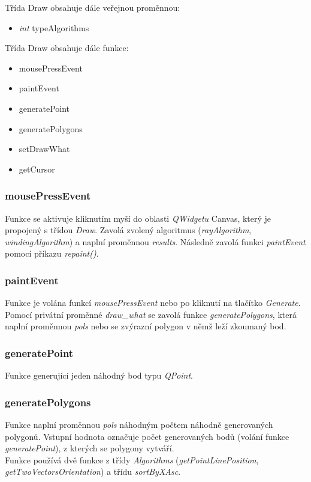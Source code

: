 \documentclass{article}
\begin{document}
Třída Draw obsahuje dále veřejnou proměnnou:
\begin{itemize}
\item \emph{int} typeAlgorithms
\end{itemize}

Třída Draw obsahuje dále funkce:
\begin{itemize}
\item mousePressEvent
\item paintEvent
\item generatePoint
\item generatePolygons
\item setDrawWhat
\item getCursor
\end{itemize}

\subsubsection{mousePressEvent}
Funkce se aktivuje kliknutím myší do oblasti \emph{QWidgetu} Canvas, který je propojený s třídou \emph{Draw}. Zavolá zvolený algoritmus (\emph{rayAlgorithm},\emph{ windingAlgorithm}) a naplní proměnnou \emph{results}. Následně zavolá funkci \emph{paintEvent} pomocí příkazu \emph{repaint()}.

\subsubsection{paintEvent}
Funkce je volána funkcí \emph{mousePressEvent} nebo po kliknutí na tlačítko \emph{Generate}. Pomocí privátní proměnné \emph{draw\_what} se zavolá funkce \emph{generatePolygons}, která naplní proměnnou \emph{pols} nebo se zvýrazní polygon v němž leží zkoumaný bod.

\subsubsection{generatePoint}
Funkce generující jeden náhodný bod typu\emph{ QPoint}.

\subsubsection{generatePolygons}
Funkce naplní proměnnou \emph{pols} náhodným počtem náhodně generovaných polygonů. Vstupní hodnota označuje počet generovaných bodů (volání funkce \emph{generatePoint}), z kterých se polygony vytváří.\\
Funkce používá dvě funkce z třídy \emph{Algorithms} (\emph{getPointLinePosition}, \emph{getTwoVectorsOrientation}) a třídu \emph{sortByXAsc}. 
\end{document}
